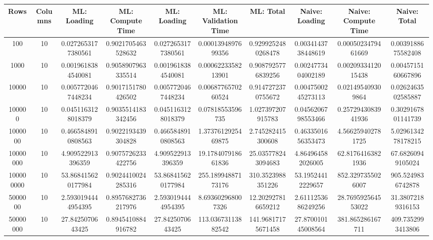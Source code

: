 \begin{table}[htb]
    \centering
    \begin{tabular}{@{}cccccccccc@{}}
        \toprule
        Rows & Columns & ML: Loading & ML: Compute Time & ML: Loading & ML: Validation Time & ML: Total & Naive: Loading & Naive: Compute Time & Naive: Total \\
        \midrule
        100 & 10 & 0.0272653177380561 & 0.9021705463528632 & 0.0272653177380561 & 0.0001394897699356 & 0.9299252480268478 & 0.0034143738448619 & 0.0005023479461669 & 0.0039188675582408 \\
        1000 & 10 & 0.0019618384540081 & 0.9058907963335514 & 0.0019618384540081 & 0.0006223358213901 & 0.9087925776839256 & 0.0024773404002189 & 0.0020933412015438 & 0.0045715160667896 \\
        10000 & 10 & 0.0057720467448234 & 0.9017151780426502 & 0.0057720467448234 & 0.0068776570260524 & 0.9147272370755672 & 0.0047500245273113 & 0.021495409309864 & 0.0262463502585887 \\
        100000 & 10 & 0.0451163128018379 & 0.9035514183342456 & 0.0451163128018379 & 0.07818553596735 & 1.027397207915783 & 0.0456206798553466 & 0.2572943083941936 & 0.3029167801141739 \\
        1000000 & 10 & 0.4665848910808563 & 0.9022193439304828 & 0.4665848910808563 & 1.3737612925469875 & 2.745282415300608 & 0.4633501656353473 & 4.566259402781725 & 5.0296134278178215 \\
        10000000 & 10 & 4.909522913396359 & 0.9075726233422756 & 4.909522913396359 & 19.178407918661836 & 25.035778243094683 & 4.864964582026005 & 62.81764163821936 & 67.68260949105024 \\
        100000000 & 10 & 53.868415620177984 & 0.9024410024285316 & 53.868415620177984 & 255.18994887173176 & 310.3523988351226 & 53.19524412229657 & 852.3297355026007 & 905.5249836742878 \\
        5000000 & 10 & 2.5930194444954395 & 0.8957682736217976 & 2.5930194444954395 & 8.693602968007326 & 12.202927816659212 & 2.6111253686249256 & 28.769592564553022 & 31.38072189316153 \\
        50000000 & 10 & 27.8425070643425 & 0.8945410884916782 & 27.8425070643425 & 113.03673113882542 & 141.96817175671458 & 27.870010145008564 & 381.865286167711 & 409.7352993413806 \\
        \bottomrule
    \end{tabular}
\end{table}